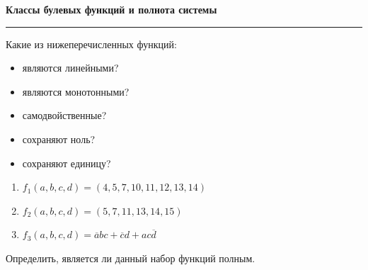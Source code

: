 \documentclass[a4paper,12pt,oneside]{article}
\begin{document}
\begin{center}
    {\Large\bfseries Классы булевых функций и полнота системы}\\[2mm]
\end{center}
\vspace{2mm}
\hrule
\vspace{4mm}

Какие из нижеперечисленных функций:
\begin{itemize}
    \item[(а)] являются линейными?
    \item[(б)] являются монотонными?
    \item[(в)] самодвойственные?
    \item[(г)] сохраняют ноль?
    \item[(д)] сохраняют единицу?
\end{itemize}

\begin{enumerate}[label=\bfseries f\arabic*)]
    \item $f_1(a,b,c,d)=(4,5,7,10,11,12,13,14)$
    \item $f_2(a,b,c,d)=(5,7,11,13,14,15)$
    \item $f_3(a,b,c,d)=\overline{a}bc+\overline{c}d+ac\overline{d}$
\end{enumerate}

\noindent
Определить, является ли данный набор функций полным.
\end{document}
